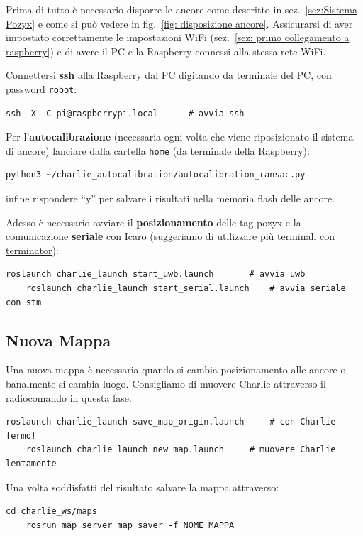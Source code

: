 Prima di tutto \`e necessario disporre le ancore come descritto in sez.~\ref{sez:Sistema Pozyx} e come si pu\`o vedere in fig.~\ref{fig: disposizione ancore}. Assicurarsi di aver impostato correttamente le impostazioni WiFi (sez.~\ref{sez: primo collegamento a raspberry}) e di avere il PC e la Raspberry connessi alla stessa rete WiFi.


Connettersi \textbf{ssh} alla Raspberry dal PC digitando da terminale del PC, con password \texttt{robot}:
\begin{lstlisting}[style=bashPC]
	ssh -X -C pi@raspberrypi.local		# avvia ssh
\end{lstlisting}

Per l'\textbf{autocalibrazione} (necessaria ogni volta che viene riposizionato il sistema di ancore) lanciare 
dalla cartella \texttt{home} (da terminale della Raspberry):
\begin{lstlisting}[style=bash]
	python3 ~/charlie_autocalibration/autocalibration_ransac.py
\end{lstlisting}
infine rispondere ``y'' per salvare i risultati nella memoria flash delle ancore.

Adesso \`e necessario avviare il \textbf{posizionamento} delle tag pozyx e la comunicazione \textbf{seriale} con Icaro (suggeriamo di utilizzare pi\`u terminali con \href{https://terminator-gtk3.readthedocs.io/en/latest/}{terminator}):
\begin{lstlisting}[style=bash]
	roslaunch charlie_launch start_uwb.launch		# avvia uwb
	roslaunch charlie_launch start_serial.launch	# avvia seriale con stm
\end{lstlisting}

\subsection*{Nuova Mappa}
Una nuova mappa \`e necessaria quando si cambia posizionamento alle ancore o banalmente si cambia luogo. Consigliamo di muovere Charlie attraverso il radiocomando in questa fase.
\begin{lstlisting}[style=bash]
	roslaunch charlie_launch save_map_origin.launch		# con Charlie fermo!
	roslaunch charlie_launch new_map.launch 	# muovere Charlie lentamente
\end{lstlisting}

Una volta soddisfatti del risultato salvare la mappa attraverso:
\begin{lstlisting}[style=bash]
	cd charlie_ws/maps
	rosrun map_server map_saver -f NOME_MAPPA
\end{lstlisting}

